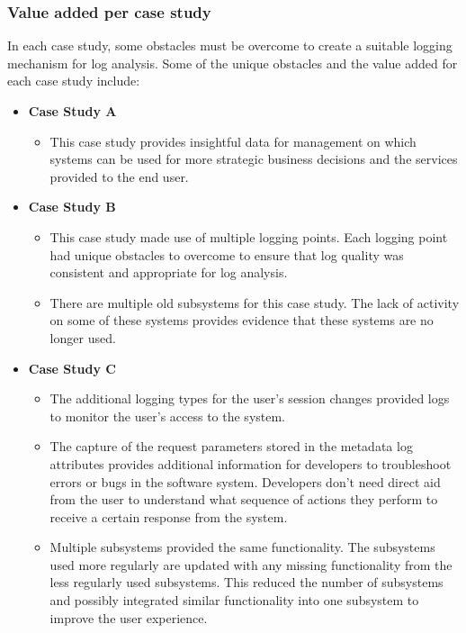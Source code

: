 \subsubsection{Value added per case study}
In each case study, some obstacles must be overcome to create a suitable logging mechanism for log analysis. Some of the unique obstacles and the value added for each case study include:

\begin{itemize}
	\item \textbf{Case Study A}
		\begin{itemize}
			\item This case study provides insightful data for management on which systems can be used for more strategic business decisions and the services provided to the end user.
		\end{itemize}
	\item \textbf{Case Study B}
	\begin{itemize}
		\item This case study made use of multiple logging points. Each logging point had unique obstacles to overcome to ensure that log quality was consistent and appropriate for log analysis.
		\item There are multiple old subsystems for this case study. The lack of activity on some of these systems provides evidence that these systems are no longer used.
	\end{itemize}
	\item \textbf{Case Study C}
	\begin{itemize}
		\item The additional logging types for the user's session changes provided logs to monitor the user's access to the system.
		\item The capture of the request parameters stored in the metadata log attributes provides additional information for developers to troubleshoot errors or bugs in the software system. Developers don't need direct aid from the user to understand what sequence of actions they perform to receive a certain response from the system.
		\item Multiple subsystems provided the same functionality. The subsystems used more regularly are updated with any missing functionality from the less regularly used subsystems. This reduced the number of subsystems and possibly integrated similar functionality into one subsystem to improve the user experience. 
	\end{itemize}
\end{itemize}


